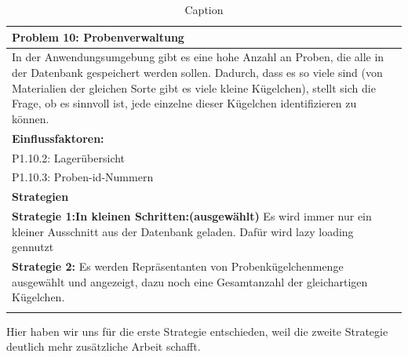 \documentclass[enabledeprecatedfontcommands,fontsize=12pt,paper=a4,twoside]{scrartcl}
\begin{document}
\begin{table}[H]
    \centering
    \begin{tabular}{|p{15cm}|}
    \hline
          \textbf{Problem 10:} Probenverwaltung
          \\ \hline
         In der Anwendungsumgebung gibt es eine hohe Anzahl an Proben, die alle in der Datenbank gespeichert werden sollen. Dadurch, dass es so viele sind (von Materialien der gleichen Sorte gibt es viele kleine Kügelchen), stellt sich die Frage, ob es sinnvoll ist, jede einzelne dieser Kügelchen identifizieren zu können.
          \\ \hline
          \textbf{Einflussfaktoren: } \\
          P1.10.2: Lagerübersicht \\
	 P1.10.3: Proben-id-Nummern \\
          \hline
          \textbf{Strategien} \\ \hline
\textbf{Strategie 1:In kleinen Schritten:(ausgewählt)} Es wird immer nur ein kleiner Ausschnitt aus der Datenbank geladen. Dafür wird lazy loading gennutzt \\
         \textbf{Strategie 2:} Es werden Repräsentanten von Probenkügelchenmenge ausgewählt und angezeigt, dazu noch eine Gesamtanzahl der gleichartigen Kügelchen. \\
          \\ \hline
    \end{tabular}
    \caption{Caption}
    \label{tab:my_label}
\end{table}

Hier haben wir uns für die erste Strategie entschieden, weil die zweite Strategie deutlich mehr zusätzliche Arbeit schafft. \\
\end{document}
